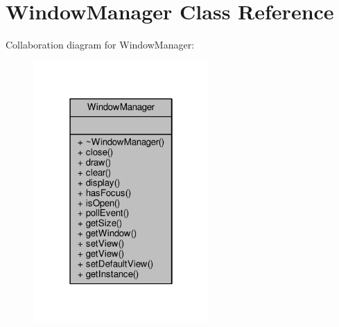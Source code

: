 \hypertarget{class_window_manager}{}\section{Window\+Manager Class Reference}
\label{class_window_manager}


Collaboration diagram for Window\+Manager\+:\nopagebreak
\begin{figure}[H]
\begin{center}
\leavevmode
\includegraphics[width=190pt]{d5/da3/class_window_manager__coll__graph}
\end{center}
\end{figure}
